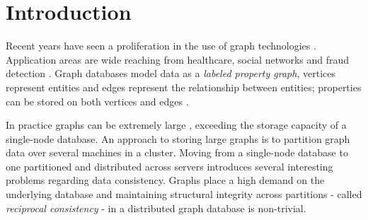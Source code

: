 \documentclass[sigplan,screen]{acmart}
\begin{document}





\maketitle

\section{Introduction}

Recent years have seen a proliferation in the use of graph technologies \cite{Besta2019}. Application areas are wide reaching from healthcare, social networks and fraud detection \cite{Eifrem2016}. Graph databases model data as a \textit{labeled property graph}, vertices represent entities and edges represent the relationship between entities; properties can be stored on both vertices and edges \cite{Robinson2015}.

In practice graphs can be extremely large \cite{Sahu2017}, exceeding the storage capacity of a single-node database. An approach to storing large graphs is to partition graph data over several machines in a cluster. Moving from a single-node database to one partitioned and distributed across servers introduces several interesting problems regarding data consistency. Graphs place a high demand on the underlying database and maintaining structural integrity across partitions - called \textit{reciprocal consistency} - in a distributed graph database is non-trivial.
\end{document}
